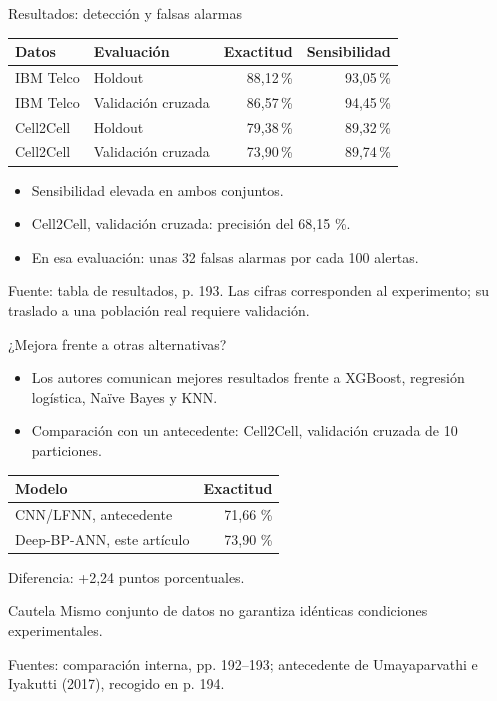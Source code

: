 \documentclass[aspectratio=169,11pt]{beamer}
\begin{document}
\begin{frame}[label={sec:org61566a5}]{Resultados: detección y falsas alarmas}
\small
\begin{center}
\begin{tabular}{llrr}
\toprule
Datos & Evaluación & Exactitud & Sensibilidad \\
\midrule
IBM Telco & Holdout & 88,12\,\% & 93,05\,\% \\
IBM Telco & Validación cruzada & 86,57\,\% & \alert{94,45\,\%} \\
Cell2Cell & Holdout & 79,38\,\% & 89,32\,\% \\
Cell2Cell & Validación cruzada & \alert{73,90\,\%} & 89,74\,\% \\
\bottomrule
\end{tabular}
\end{center}
\normalsize

\begin{itemize}
\item Sensibilidad elevada en ambos conjuntos.
\item Cell2Cell, validación cruzada: precisión del \alert{68,15 \%}.
\item En esa evaluación: unas \alert{32 falsas alarmas por cada 100 alertas}.
\end{itemize}

\vfill
\footnotesize Fuente: tabla de resultados, p. 193. Las cifras corresponden al experimento; su traslado a una población real requiere validación.
\end{frame}
\begin{frame}[label={sec:org5806bd7}]{¿Mejora frente a otras alternativas?}
\begin{itemize}
\item Los autores comunican mejores resultados frente a \alert{XGBoost, regresión logística, Naïve Bayes y KNN}.
\item Comparación con un antecedente: \alert{Cell2Cell, validación cruzada de 10 particiones}.
\end{itemize}

\begin{center}
\begin{tabular}{lr}
\toprule
Modelo & Exactitud\\
\midrule
CNN/LFNN, antecedente & 71,66 \%\\
Deep-BP-ANN, este artículo & 73,90 \%\\
\bottomrule
\end{tabular}
\end{center}

\alert{Diferencia: +2,24 puntos porcentuales.}

\begin{alertblock}{Cautela}
Mismo conjunto de datos no garantiza idénticas condiciones experimentales.
\end{alertblock}

\vfill
\footnotesize Fuentes: comparación interna, pp. 192--193; antecedente de Umayaparvathi e Iyakutti (2017), recogido en p. 194.
\end{frame}
\end{document}
